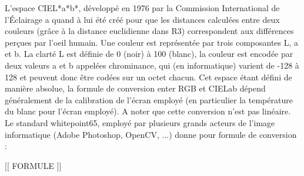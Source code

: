 \documentclass[12pt,a4paper]{article}
\begin{document}
L'espace CIEL*a*b*, développé en 1976 par la Commission International de l'Éclairage a quand à lui été créé pour que les distances calculées entre deux couleurs (grâce à la distance euclidienne dans R3) correspondent aux différences perçues par l'oeil humain. Une couleur est représentée par trois composantes L, a et b. La clarté L est définie de 0 (noir) à 100 (blanc), la couleur est encodée par deux valeurs a et b appelées chrominance, qui (en informatique) varient de -128 à 128 et peuvent donc être codées sur un octet chacun. Cet espace étant défini de manière absolue, la formule de conversion enter RGB et CIELab dépend généralement de la calibration de l'écran employé (en particulier la température du blanc pour l'écran employé). A noter que cette conversion n'est pas linéaire. Le standard whitepoint65, employé par plusieurs grands acteurs de l'image informatique (Adobe Photoshop, OpenCV, ...) donne pour formule de conversion :

[[ FORMULE ]]
\end{document}
